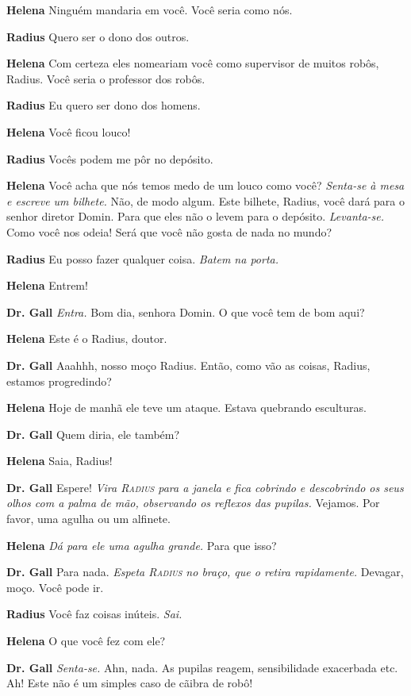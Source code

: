 \textbf{Helena} Ninguém mandaria em você. Você seria como nós.

\textbf{Radius} Quero ser o dono dos outros.

\textbf{Helena} Com certeza eles nomeariam você como supervisor de muitos robôs, Radius.
Você seria o professor dos robôs.

\textbf{Radius} Eu quero ser dono dos homens.

\textbf{Helena} Você ficou louco!

\textbf{Radius} Vocês podem me pôr no depósito.

\textbf{Helena} Você acha que nós temos medo de um louco como você? \emph{Senta-se à
mesa e escreve um bilhete.} Não, de modo algum. Este bilhete, Radius, você dará para
o senhor diretor Domin. Para que eles não o levem para o depósito.
\emph{Levanta-se.} Como você nos odeia! Será que você não gosta de nada no
mundo?

\textbf{Radius} Eu posso fazer qualquer coisa.
\emph{Batem na porta.}

\textbf{Helena} Entrem!

\textbf{Dr. Gall} \emph{Entra.} Bom dia, senhora Domin. O que você tem de bom aqui?

\textbf{Helena} Este é o Radius, doutor.

\textbf{Dr. Gall} Aaahhh, nosso moço Radius. Então, como vão as coisas, Radius, estamos
progredindo?

\textbf{Helena} Hoje de manhã ele teve um ataque. Estava quebrando esculturas.

\textbf{Dr. Gall} Quem diria, ele também?

\textbf{Helena} Saia, Radius!

\textbf{Dr. Gall} Espere! \emph{Vira \textsc{Radius} para a janela e fica cobrindo e
descobrindo os seus olhos com a palma de mão, observando os reflexos das pupilas.} Vejamos. Por
favor, uma agulha ou um alfinete.

\textbf{Helena} \emph{Dá para ele uma agulha grande.} Para que isso?

\textbf{Dr. Gall} Para nada. \emph{Espeta \textsc{Radius} no braço, que o retira rapidamente.}
Devagar, moço. Você pode ir.

\textbf{Radius} Você faz coisas inúteis. \emph{Sai.}

\textbf{Helena} O que você fez com ele?

\textbf{Dr. Gall} \emph{Senta-se.} Ahn, nada. As pupilas reagem, sensibilidade
exacerbada etc. Ah! Este não é um simples caso de cãibra de robô!

